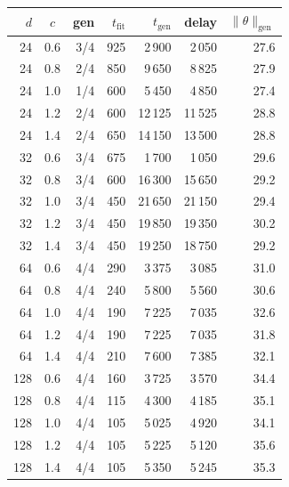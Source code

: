 \begin{tabular}{rcrrrrr}
\toprule
$d$ & $c$ & gen & $t_{\mathrm{fit}}$ & $t_{\mathrm{gen}}$ & delay & $\|\theta\|_{\mathrm{gen}}$ \\
\midrule
24 & 0.6 & 3/4 & 925 & 2\,900 & 2\,050 & 27.6 \\
24 & 0.8 & 2/4 & 850 & 9\,650 & 8\,825 & 27.9 \\
24 & 1.0 & 1/4 & 600 & 5\,450 & 4\,850 & 27.4 \\
24 & 1.2 & 2/4 & 600 & 12\,125 & 11\,525 & 28.8 \\
24 & 1.4 & 2/4 & 650 & 14\,150 & 13\,500 & 28.8 \\
32 & 0.6 & 3/4 & 675 & 1\,700 & 1\,050 & 29.6 \\
32 & 0.8 & 3/4 & 600 & 16\,300 & 15\,650 & 29.2 \\
32 & 1.0 & 3/4 & 450 & 21\,650 & 21\,150 & 29.4 \\
32 & 1.2 & 3/4 & 450 & 19\,850 & 19\,350 & 30.2 \\
32 & 1.4 & 3/4 & 450 & 19\,250 & 18\,750 & 29.2 \\
64 & 0.6 & 4/4 & 290 & 3\,375 & 3\,085 & 31.0 \\
64 & 0.8 & 4/4 & 240 & 5\,800 & 5\,560 & 30.6 \\
64 & 1.0 & 4/4 & 190 & 7\,225 & 7\,035 & 32.6 \\
64 & 1.2 & 4/4 & 190 & 7\,225 & 7\,035 & 31.8 \\
64 & 1.4 & 4/4 & 210 & 7\,600 & 7\,385 & 32.1 \\
128 & 0.6 & 4/4 & 160 & 3\,725 & 3\,570 & 34.4 \\
128 & 0.8 & 4/4 & 115 & 4\,300 & 4\,185 & 35.1 \\
128 & 1.0 & 4/4 & 105 & 5\,025 & 4\,920 & 34.1 \\
128 & 1.2 & 4/4 & 105 & 5\,225 & 5\,120 & 35.6 \\
128 & 1.4 & 4/4 & 105 & 5\,350 & 5\,245 & 35.3 \\
\bottomrule
\end{tabular}
